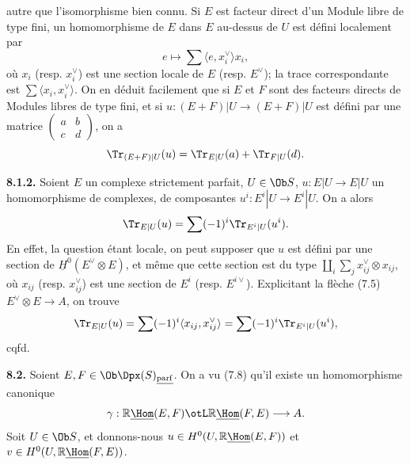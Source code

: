 autre que l'isomorphisme bien connu. Si \(E\) est facteur direct d'un Module libre de type fini, un homomorphisme de \(E\) dans \(E\) au-dessus de \(U\) est défini localement par
\[
  e\longmapsto \sum\langle e,x_i^\vee\rangle x_i,
\]
où \(x_i\) (resp. \(x_i^\vee\)) est une section locale de \(E\) (resp. \(E^\vee\)); la trace correspondante est \(\sum\langle x_i,x_i^\vee\rangle\). On en déduit facilement que si \(E\) et \(F\) sont des facteurs directs de Modules libres de type fini, et si \(u:(E+F)|U\longrightarrow(E+F)|U\) est défini par une matrice \(\begin{pmatrix}a&b\\ c&d\end{pmatrix}\), on a
\[
  \Tr_{(E+F)|U}(u)=\Tr_{E|U}(a)+\Tr_{F|U}(d).
\]

\textbf{8.1.2.} Soient \(E\) un complexe strictement parfait, \(U\in\Ob S\), \(u:E|U\longrightarrow E|U\) un homomorphisme de complexes, de composantes \(u^i:E^i|U\to E^i|U\). On a alors
\[
  \Tr_{E|U}(u)=\sum(-1)^i\Tr_{E^i|U}(u^i).
\]
En effet, la question étant locale, on peut supposer que \(u\) est défini par une section de \(\underline{H}^0(E^\vee\otimes E)\), et même que cette section est du type \(\coprod_i\sum_j x_{ij}^\vee\otimes x_{ij}\), où \(x_{ij}\) (resp. \(x_{ij}^\vee\)) est une section de \(E^i\) (resp. \(E^{i\vee}\)). Explicitant la flèche (7.5) \(E^\vee\otimes E\to A\), on trouve
\[
  \Tr_{E|U}(u)=\sum(-1)^i\langle x_{ij},x_{ij}^\vee\rangle
  =\sum(-1)^i\Tr_{E^i|U}(u^i),
\]
cqfd.

\textbf{8.2.} Soient \(E,F\in\Ob\Dpx(S)_{\underline{\mathrm{parf}}}\). On a vu (7.8) qu'il existe un homomorphisme canonique
\[
  \gamma:\mathbb{R}\underline{\Hom}(E,F)\otL\mathbb{R}\underline{\Hom}(F,E)\longrightarrow A.
\]
Soit \(U\in\Ob S\), et donnons-nous \(u\in H^0(U,\mathbb{R}\underline{\Hom}(E,F))\) et \(v\in H^0(U,\mathbb{R}\underline{\Hom}(F,E))\).
